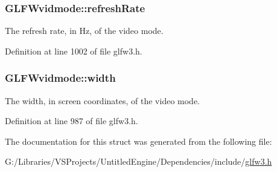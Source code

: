 \hypertarget{struct_g_l_f_wvidmode_a791bdd6c7697b09f7e9c97054bf05649}{}
\subsubsection[{refresh\+Rate}]{ G\+L\+F\+Wvidmode\+::refresh\+Rate}\label{struct_g_l_f_wvidmode_a791bdd6c7697b09f7e9c97054bf05649}
The refresh rate, in Hz, of the video mode. 

Definition at line 1002 of file glfw3.\+h.

\hypertarget{struct_g_l_f_wvidmode_a698dcb200562051a7249cb6ae154c71d}{}
\subsubsection[{width}]{ G\+L\+F\+Wvidmode\+::width}\label{struct_g_l_f_wvidmode_a698dcb200562051a7249cb6ae154c71d}
The width, in screen coordinates, of the video mode. 

Definition at line 987 of file glfw3.\+h.



The documentation for this struct was generated from the following file\+:\begin{DoxyCompactItemize}
\item 
G\+:/\+Libraries/\+V\+S\+Projects/\+Untitled\+Engine/\+Dependencies/include/\hyperlink{glfw3_8h}{glfw3.\+h}\end{DoxyCompactItemize}
